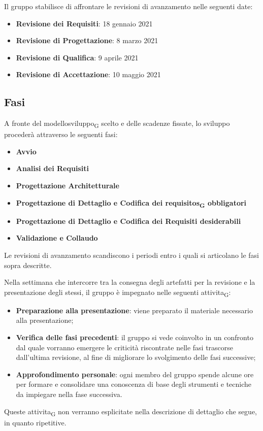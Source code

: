 Il gruppo stabilisce di affrontare le revisioni di avanzamento nelle seguenti date:
\begin{itemize}
	\item \textbf{Revisione dei Requisiti}: 18 gennaio 2021
	\item \textbf{Revisione di Progettazione}: 8 marzo 2021 
	\item \textbf{Revisione di Qualifica}: 9 aprile 2021
	\item \textbf{Revisione di Accettazione}: 10 maggio 2021	
\end{itemize}





\subsection{Fasi}

A fronte del \gls{modellosviluppo}\textsubscript{G} scelto e delle scadenze fissate, lo sviluppo procederà attraverso le seguenti fasi:
\begin{itemize}
	\item \textbf{Avvio}
	\item \textbf{Analisi dei Requisiti}
	\item \textbf{Progettazione Architetturale}
	\item \textbf{Progettazione di Dettaglio e Codifica dei \glspl{requisito}\textsubscript{G} obbligatori}
	\item \textbf{Progettazione di Dettaglio e Codifica dei Requisiti desiderabili}
	\item \textbf{Validazione e Collaudo}
\end{itemize}

Le revisioni di avanzamento scandiscono i periodi entro i quali si articolano le fasi sopra descritte.

Nella settimana che intercorre tra la consegna degli artefatti per la revisione e la presentazione degli stessi, il gruppo è impegnato nelle seguenti \gls{attivita}\textsubscript{G}: 
\begin{itemize}
	\item \textbf{Preparazione alla presentazione}: viene preparato il materiale necessario alla presentazione;
	\item \textbf{Verifica delle fasi precedenti}: il gruppo si vede coinvolto in un confronto dal quale vorranno emergere le criticità riscontrate nelle fasi trascorse dall'ultima revisione, al fine di migliorare lo svolgimento delle fasi successive;
	\item \textbf{Approfondimento personale}: ogni membro del gruppo spende alcune ore per formare e consolidare una conoscenza di base degli strumenti e tecniche da impiegare nella fase successiva.
\end{itemize}
Queste \gls{attivita}\textsubscript{G} non verranno esplicitate nella descrizione di dettaglio che segue, in quanto ripetitive.



